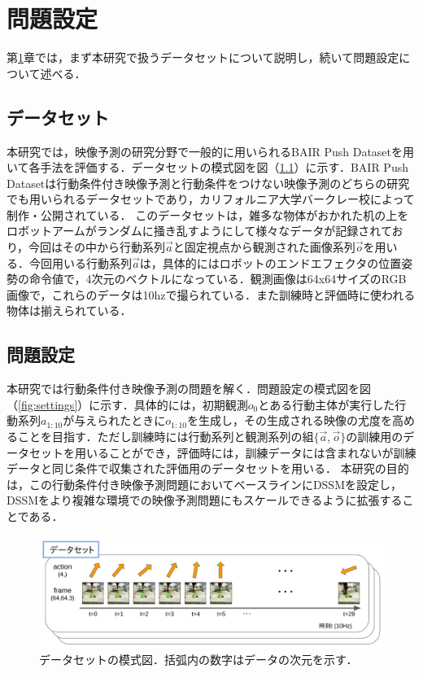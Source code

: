\chapter{問題設定}
\label{chap:settings}

第\ref{chap:settings}章では，まず本研究で扱うデータセットについて説明し，続いて問題設定について述べる．

\section{データセット}

本研究では，映像予測の研究分野で一般的に用いられるBAIR Push Dataset\cite{ebert2017selfsupervised}を用いて各手法を評価する．データセットの模式図を図（\ref{fig:dataset}）に示す．BAIR Push Datasetは行動条件付き映像予測と行動条件をつけない映像予測のどちらの研究でも用いられるデータセットであり，カリフォルニア大学バークレー校によって制作・公開されている．
このデータセットは，雑多な物体がおかれた机の上をロボットアームがランダムに掻き乱すようにして様々なデータが記録されており，今回はその中から行動系列$\vec{a}$と固定視点から観測された画像系列$\vec{o}$を用いる．今回用いる行動系列$\vec{a}$は，具体的にはロボットのエンドエフェクタの位置姿勢の命令値で，4次元のベクトルになっている．観測画像は64x64サイズのRGB画像で，これらのデータは10hzで撮られている．また訓練時と評価時に使われる物体は揃えられている．


\section{問題設定}

本研究では行動条件付き映像予測の問題を解く．問題設定の模式図を図（\ref{fig:settings}）に示す．具体的には，初期観測$o_0$とある行動主体が実行した行動系列$a_{1:10}$が与えられたときに$o_{1:10}$を生成し，その生成される映像の尤度を高めることを目指す．ただし訓練時には行動系列と観測系列の組$\{\vec{a}, \vec{o}\}$の訓練用のデータセットを用いることができ，評価時には，訓練データには含まれないが訓練データと同じ条件で収集された評価用のデータセットを用いる．
本研究の目的は，この行動条件付き映像予測問題においてベースラインにDSSMを設定し，DSSMをより複雑な環境での映像予測問題にもスケールできるように拡張することである．

\begin{figure}[h]
    \begin{center}
      \includegraphics[scale=0.22]{./figures/dataset.png}
      \caption[データセットの模式図]{データセットの模式図．括弧内の数字はデータの次元を示す．}
      \label{fig:dataset}
    \end{center}
  \end{figure}


